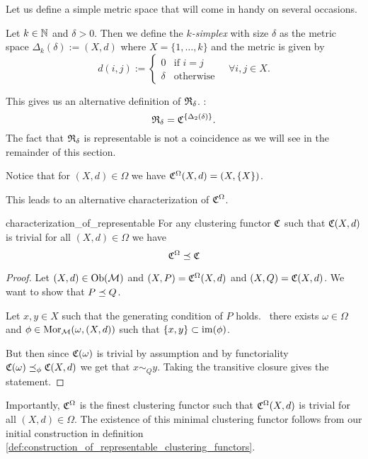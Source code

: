 Let us define a simple metric space that will come in handy on several occasions.
\begin{definition}{}{}
    Let $k \in \mathbb N$ and $\delta > 0$. Then we define the \emph{$k$-simplex} with size $\delta$ as the metric space $\Delta_k(\delta) := (X,d)$ where $X = \{1, \dots, k\}$ and the metric is given by
    $$
    d(i,j) := \begin{cases}
        0 & \text{if } i = j\\
        \delta & \text{otherwise}
    \end{cases} \quad \forall i,j \in X.
    $$
\end{definition}

This gives us an alternative definition of $\mathfrak{R}_\delta$. \Ie:
$$
\mathfrak{R}_\delta = \mathfrak{C}^{\{\Delta_2(\delta)\}}.
$$
The fact that $\mathfrak{R}_\delta$ is representable is not a coincidence as we will see in the remainder of this section.
\begin{myremark}{\cite[Rem.~6.3]{Carlsson2010}}{}
Notice that for $(X,d) \in \Omega$ we have $\mathfrak{C}^\Omega(X,d) = (X, \{X\})$.
\end{myremark}

This leads to an alternative characterization of $\mathfrak{C}^\Omega$.

\begin{proposition}{}{characterization_of_representable}
For any clustering functor $\mathfrak{C}$ such that $\mathfrak{C}(X,d)$ is trivial for all $(X,d) \in \Omega$ we have
$$
\mathfrak{C}^\Omega \preceq \mathfrak{C}
$$
\end{proposition}

\begin{proof}
Let $(X,d) \in \mathrm {Ob}(\mathcal{M})$ and $(X,P) = \mathfrak{C}^\Omega(X,d)$ and $(X,Q) = \mathfrak{C}(X,d)$. We want to show that $P \preceq Q$.

Let $x,y \in X$ such that the generating condition of $P$ holds. \Ie\ there exists $\omega \in \Omega$ and $\phi \in \mathrm {Mor}_{\mathcal{M}}(\omega, (X,d))$ such that $\{x,y\} \subset \operatorname*{im}(\phi)$.

But then since $\mathfrak{C}(\omega)$ is trivial by assumption and by functoriality $\mathfrak{C}(\omega) \preceq_\phi \mathfrak{C}(X,d)$ we get that $x \sim_Q y$. Taking the transitive closure gives the statement.


\end{proof}

Importantly, $\mathfrak{C}^\Omega$ is the finest clustering functor such that $\mathfrak{C}^\Omega(X,d)$ is trivial for all $(X,d) \in \Omega$. The existence of this minimal clustering functor follows from our initial construction in definition \ref{def:construction_of_representable_clustering_functors}.


